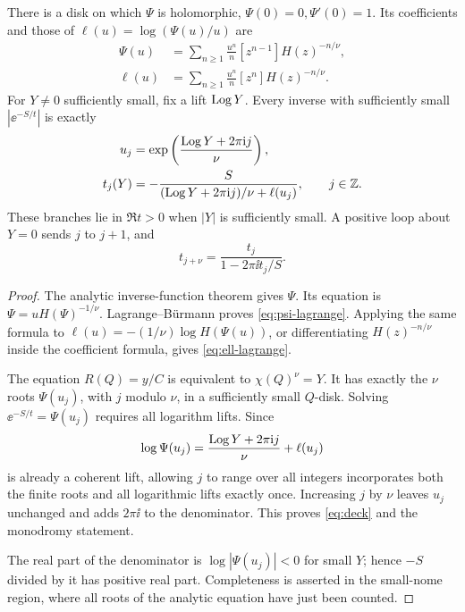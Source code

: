 \begin{theorem}\label{thm:flat-inverse}
There is a disk on which \(\Psi\) is holomorphic,
\(\Psi(0)=0,\Psi'(0)=1\).  Its coefficients and those of
\(\ell(u)=\log(\Psi(u)/u)\) are
\begin{align}
 \Psi(u)&=\sum_{n\ge1}\frac{u^n}{n}
             [z^{n-1}]H(z)^{-n/\nu},\label{eq:psi-lagrange}\\
 \ell(u)&=\sum_{n\ge1}\frac{u^n}{n}
             [z^n]H(z)^{-n/\nu}.\label{eq:ell-lagrange}
\end{align}
For \(Y\ne0\) sufficiently small, fix a lift \(\operatorname{Log} Y\).
Every inverse with sufficiently small \(|\ee^{-S/t}|\) is exactly
\begin{align}
 u_j&=\exp\left(\frac{\operatorname{Log} Y+2\pi\mathrm i j}{\nu}\right),\notag\\
 t_j(Y)&=
 -\frac{S}{(\operatorname{Log} Y+2\pi\mathrm i j)/\nu+\ell(u_j)},
 \qquad j\in\mathbb Z.\label{eq:all-flat-sheets}
\end{align}
These branches lie in \(\Re t>0\) when \(|Y|\) is sufficiently
small.  A positive loop about \(Y=0\) sends \(j\) to \(j+1\), and
\begin{equation}\label{eq:deck}
 t_{j+\nu}=\frac{t_j}{1-2\pi\ii t_j/S}.
\end{equation}
\end{theorem}
\begin{proof}
The analytic inverse-function theorem gives \(\Psi\).
Its equation is
\(\Psi=uH(\Psi)^{-1/\nu}\).
Lagrange--B\"urmann proves \cref{eq:psi-lagrange}.
Applying the same formula to
\(\ell(u)=-(1/\nu)\log H(\Psi(u))\), or differentiating
\(H(z)^{-n/\nu}\) inside the coefficient formula, gives
\cref{eq:ell-lagrange}.

The equation \(R(Q)=y/C\) is equivalent to
\(\chi(Q)^\nu=Y\).
It has exactly the \(\nu\) roots
\(\Psi(u_j)\), with \(j\) modulo \(\nu\), in a sufficiently
small \(Q\)-disk.  Solving
\(\ee^{-S/t}=\Psi(u_j)\) requires all logarithm lifts.
Since
\[
 \log\Psi(u_j)=
 \frac{\operatorname{Log} Y+2\pi\mathrm i j}{\nu}+\ell(u_j)
\]
is already a coherent lift, allowing \(j\) to range over all
integers incorporates both the finite roots and all logarithmic
lifts exactly once.  Increasing \(j\) by \(\nu\) leaves \(u_j\)
unchanged and adds \(2\pi\ii\) to the denominator.  This proves
\cref{eq:deck} and the monodromy statement.

The real part of the denominator is
\(\log|\Psi(u_j)|<0\) for small \(Y\); hence
\(-S\) divided by it has positive real part.
Completeness is asserted in the small-nome region, where all
roots of the analytic equation have just been counted.
\end{proof}

